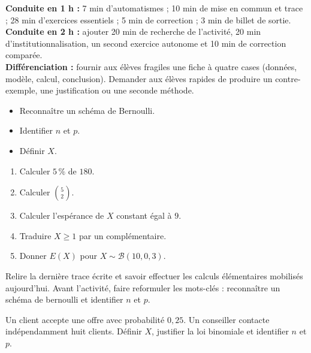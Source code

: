 \ifprof
\begin{methode}
\textbf{Conduite en 1 h :} 7 min d'automatismes ; 10 min de mise en commun et trace ; 28 min d'exercices essentiels ; 5 min de correction ; 3 min de billet de sortie.\\
\textbf{Conduite en 2 h :} ajouter 20 min de recherche de l'activité, 20 min d'institutionnalisation, un second exercice autonome et 10 min de correction comparée.\\
\textbf{Différenciation :} fournir aux élèves fragiles une fiche à quatre cases (données, modèle, calcul, conclusion). Demander aux élèves rapides de produire un contre-exemple, une justification ou une seconde méthode.
\end{methode}
\fi
{}
\begin{objectifs}\begin{itemize}\item Reconnaître un schéma de Bernoulli.\item Identifier $n$ et $p$.\item Définir $X$.\end{itemize}\end{objectifs}
\begin{automatismes}\begin{enumerate}\item Calculer $5\,\%$ de $180$. \item Calculer $\binom52$. \item Calculer l'espérance de $X$ constant égal à $9$. \item Traduire $X\geq1$ par un complémentaire. \item Donner $E(X)$ pour $X\sim\mathcal B(10,0{,}3)$. \end{enumerate}\end{automatismes}
\begin{prerequis}Relire la dernière trace écrite et savoir effectuer les calculs élémentaires mobilisés aujourd'hui. Avant l'activité, faire reformuler les mots-clés : reconnaître un schéma de bernoulli et identifier $n$ et $p$.\end{prerequis}

\begin{activite}
Un client accepte une offre avec probabilité $0{,}25$. Un conseiller contacte indépendamment huit clients. Définir $X$, justifier la loi binomiale et identifier $n$ et $p$.

\end{activite}

